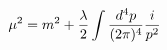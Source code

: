 \begin{equation}
\label{dodici}
\mu ^2=  m^2   + {\lambda \over 2} \int \frac{d^4 p}{(2\pi)^4} {{i} \over {p^2}}
\end{equation}

